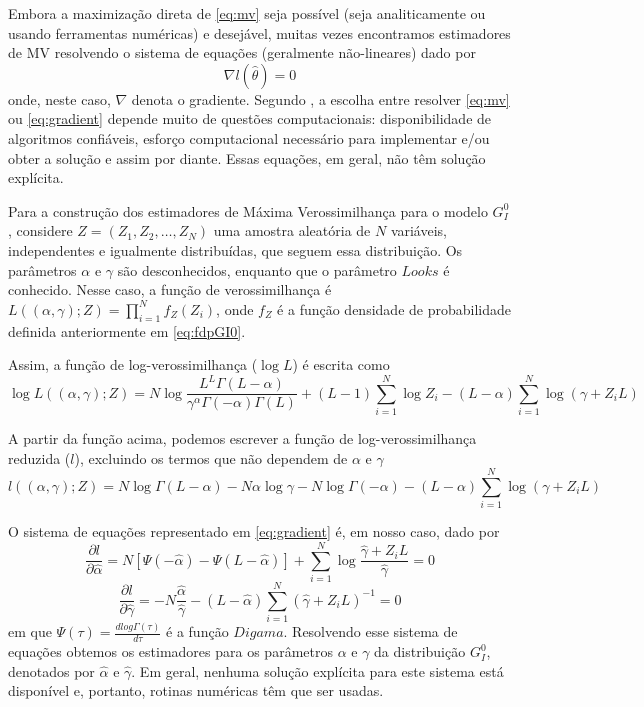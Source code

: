 \documentclass[12pt]{article}
\begin{document}
Embora a maximização direta de \eqref{eq:mv} seja possível (seja analiticamente ou usando ferramentas numéricas) e desejável, muitas vezes encontramos estimadores de MV resolvendo o sistema de equações (geralmente não-lineares) dado por
\begin{equation}
    \nabla l(\widehat{\theta}) = 0 \label{eq:gradient} 
\end{equation}
onde, neste caso, $\nabla$ denota o gradiente. Segundo \citet{FreryMinute2004}, a escolha entre resolver \eqref{eq:mv} ou \eqref{eq:gradient} depende muito de questões computacionais: disponibilidade de algoritmos confiáveis, esforço computacional necessário para implementar e/ou obter a solução e assim por diante. Essas equações, em geral, não têm solução explícita.

Para a construção dos estimadores de Máxima Verossimilhança para o modelo $G_I^0$, considere $Z = (Z_1, Z_2, \dots, Z_N)$ uma amostra aleatória de $N$ variáveis, independentes e igualmente distribuídas, que seguem essa distribuição. Os parâmetros $\alpha$ e $\gamma$ são desconhecidos, enquanto que o parâmetro $Looks$ é conhecido. Nesse caso, a função de verossimilhança é $L((\alpha, \gamma); Z) = \prod_{i=1}^{N} f_Z(Z_i)$, onde $f_Z$ é a função densidade de probabilidade definida anteriormente em \eqref{eq:fdpGI0}. 

Assim, a função de log-verossimilhança ($\log L$) é escrita como
\begin{equation}
    \log L((\alpha, \gamma); Z) = N\log \frac{L^{L}\Gamma(L-\alpha)}{\gamma^{\alpha}\Gamma(-\alpha)\Gamma(L)} +  (L-1)\sum_{i=1}^{N}\log Z_i - (L-\alpha)\sum_{i=1}^{N}\log (\gamma + Z_iL) \label{eq:logVer}
\end{equation}

A partir da função acima, podemos escrever a função de log-verossimilhança reduzida ($l$), excluindo os termos que não dependem de $\alpha$ e $\gamma$
\begin{equation}
    l((\alpha, \gamma); Z) = N\log\Gamma(L-\alpha) - N\alpha \log\gamma - N\log\Gamma(-\alpha) - (L-\alpha)\sum_{i=1}^{N}\log(\gamma +Z_iL) \label{eq:logVerRed}
\end{equation}

O sistema de equações representado em \eqref{eq:gradient} é, em nosso caso, dado por
\begin{equation}
  \frac{\partial l}{\partial \widehat{\alpha}} = N[\Psi(-\widehat{\alpha}) - \Psi(L-\widehat{\alpha})] + \sum_{i=1}^{N}\log\frac{\widehat{\gamma} + Z_iL}{\widehat{\gamma}} = 0
\end{equation}
\begin{equation}
   \frac{\partial l}{\partial \widehat{\gamma}} = -N\frac{\widehat{\alpha}}{\widehat{\gamma}} - (L - \widehat{\alpha})\sum_{i=1}^{N}(\widehat{\gamma} + Z_iL)^{-1} = 0
\end{equation}
em que $\Psi(\tau) = \frac{\textit{d}log\Gamma(\tau)}{\textit{d}\tau}$ é a função $Digama$. Resolvendo esse sistema de equações obtemos os estimadores para os parâmetros $\alpha$ e $\gamma$ da distribuição $G_I^0$, denotados por $\widehat{\alpha}$ e $\widehat{\gamma}$. Em geral, nenhuma solução explícita para este sistema está disponível e, portanto, rotinas numéricas têm que ser usadas.
\end{document}
